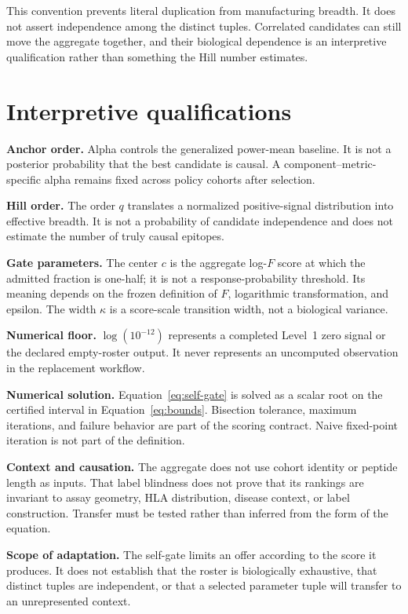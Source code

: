 \documentclass[11pt]{article}
\begin{document}
This convention prevents literal duplication from manufacturing breadth. It
does not assert independence among the distinct tuples. Correlated candidates
can still move the aggregate together, and their biological dependence is an
interpretive qualification rather than something the Hill number estimates.

\section{Interpretive qualifications}

\textbf{Anchor order.}
Alpha controls the generalized power-mean baseline. It is not a posterior
probability that the best candidate is causal. A component--metric-specific
alpha remains fixed across policy cohorts after selection.

\textbf{Hill order.}
The order $q$ translates a normalized positive-signal distribution into
effective breadth. It is not a probability of candidate independence and does
not estimate the number of truly causal epitopes.

\textbf{Gate parameters.}
The center $c$ is the aggregate log-$F$ score at which the admitted fraction is
one-half; it is not a response-probability threshold. Its meaning depends on
the frozen definition of $F$, logarithmic transformation, and epsilon. The
width $\kappa$ is a score-scale transition width, not a biological variance.

\textbf{Numerical floor.}
$\log(10^{-12})$ represents a completed Level~1 zero signal or the declared
empty-roster output. It never represents an uncomputed observation in the
replacement workflow.

\textbf{Numerical solution.}
Equation~\eqref{eq:self-gate} is solved as a scalar root on the certified
interval in Equation~\eqref{eq:bounds}. Bisection tolerance, maximum
iterations, and failure behavior are part of the scoring contract. Naive
fixed-point iteration is not part of the definition.

\textbf{Context and causation.}
The aggregate does not use cohort identity or peptide length as inputs. That
label blindness does not prove that its rankings are invariant to assay
geometry, HLA distribution, disease context, or label construction. Transfer
must be tested rather than inferred from the form of the equation.

\textbf{Scope of adaptation.}
The self-gate limits an offer according to the score it produces. It does not
establish that the roster is biologically exhaustive, that distinct tuples are
independent, or that a selected parameter tuple will transfer to an
unrepresented context.
\end{document}
